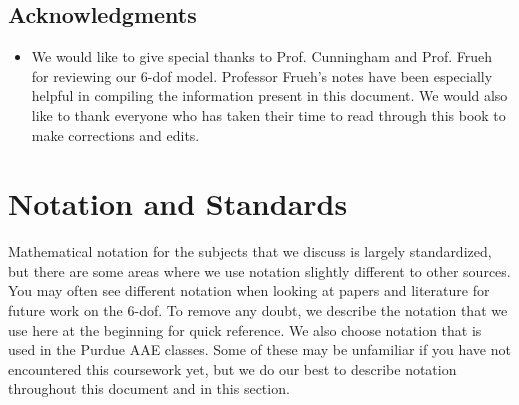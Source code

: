 \documentclass[10pt, openany, titlepage]{book}
\theoremstyle{definition}
\let\oldautoref\autoref
\renewcommand{\autoref}[1]{%
  \begingroup
  \hypersetup{linkcolor=black}%
  \oldautoref{#1}%
  \endgroup
}
\begin{document}





\section*{Acknowledgments}
\begin{itemize}
\item We would like to give special thanks to Prof. Cunningham and Prof. Frueh for reviewing our 6-\gls{dof} model. Professor Frueh's notes have been especially helpful in compiling the information present in this document. We would also like to thank everyone who has taken their time to read through this book to make corrections and edits.
\end{itemize}


\chapter*{Notation and Standards}

Mathematical notation for the subjects that we discuss is largely standardized, but there are some areas where we use notation slightly different to other sources. You may often see different notation when looking at papers and literature for future work on the 6-\gls{dof}. To remove any doubt, we describe the notation that we use here at the beginning for quick reference. We also choose notation that is used in the Purdue AAE classes. Some of these may be unfamiliar if you have not encountered this coursework yet, but we do our best to describe notation throughout this document and in this section.
\end{document}
